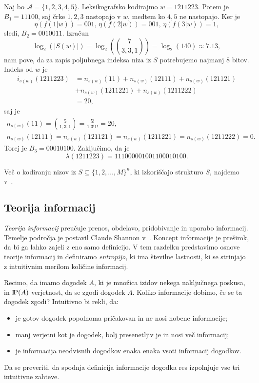 \documentclass[fin1, tisk]{fmfdelo}
\providecommand{\abs}[1]{\left\lvert #1 \right\rvert}
\newcommand{\probP}{\text{I\kern-0.15em P}}
\newcommand{\A}{\mathcal{A}}
\theoremstyle{definition}
\begin{document}
\begin{primer}\label{primer:leksikografsko}
    Naj bo $\A = \{ 1, 2, 3, 4, 5 \}$. Leksikografsko kodirajmo $w = 1211223$. Potem je
    $B_1 = 11100$, saj črke $1,2,3$ nastopajo v $w$, medtem ko $4,5$ ne nastopajo. Ker je
    \[
        \eta \left( f(1|w) \right) = 001, \, \eta \left( f(2|w) \right) = 001, \,
        \eta \left( f(3|w) \right) = 1,
    \]
    sledi, $B_2 = 0010011$. Izračun
    \[
        \log_2(\abs{S(w)}) = \log_2 \left( \binom{7}{3,3,1} \right) = \log_2(140) \approx 7.13,
    \]
    nam pove, da za zapis poljubnega indeksa niza iz $S$ potrebujemo najmanj $8$ bitov. 
    Indeks od $w$ je
    \begin{align*}
        i_{s(w)}(1211223) &= n_{s(w)}(11) + n_{s(w)}(12111) + n_{s(w)}(121121) \\
        &+ n_{s(w)}(1211221) + n_{s(w)}(1211222) \\
        &= 20,
    \end{align*}
    saj je
    \begin{gather*}
        n_{s(w)}(11) = \binom{5}{1,3,1} = \frac{5!}{1!3!1!} = 20, \\
        n_{s(w)}(12111) = n_{s(w)}(121121) = n_{s(w)}(1211221) = n_{s(w)}(1211222) = 0.
    \end{gather*}
    Torej je $B_3 = 00010100$. Zaključimo, da je
    \[
        \lambda(1211223) = 111000 0010011 00010100.
    \]
\end{primer}

Več o kodiranju nizov iz $S \subseteq \{ 1,2, \ldots, M\}^n$, ki izkoriščajo strukturo $S$, 
najdemo v~\cite{Cover1973}.

\subsection{Teorija informacij}

\emph{Teorija informacij} preučuje prenos, obdelavo, pridobivanje in uporabo informacij. Temelje
področja je postavil Claude Shannon v~\cite{Shannon1949}. Koncept informacije je preširok, da bi 
ga lahko zajeli z eno samo definicijo. V tem razdelku predstavimo osnove teorije informacij in 
definiramo \emph{entropijo}, ki ima številne lastnosti, ki se strinjajo z intuitivnim merilom količine informacij.

Recimo, da imamo dogodek $A$, ki je množica izidov nekega naključnega poskusa, in $\probP(A)$
verjetnost, da se zgodi dogodek $A$. Koliko informacije dobimo, če se ta dogodek zgodi? Intuitivno
bi rekli, da:
\begin{itemize}
    \item je gotov dogodek popolnoma pričakovan in ne nosi nobene informacije;
    \item manj verjetni kot je dogodek, bolj presenetljiv je in nosi več informacij;
    \item je informacija neodvisnih dogodkov enaka enaka vsoti informacij dogodkov.
\end{itemize}
Da se preveriti, da spodnja definicija informacije dogodka res izpolnjuje vse tri intuitivne zahteve.
\end{document}
